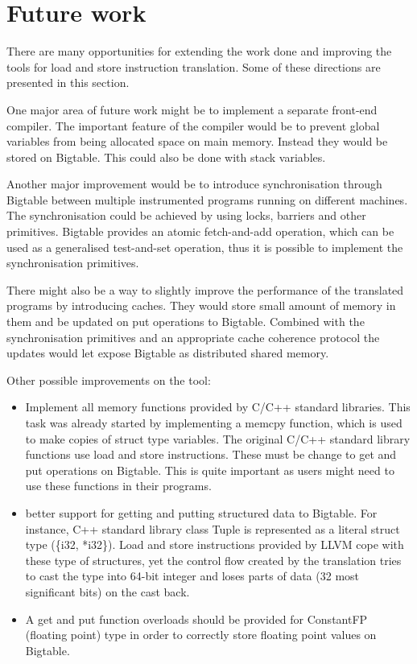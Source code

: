 \documentclass[bsc,frontabs,twoside,singlespacing,parskip,deptreport]{infthesis}     %
\begin{document}
\section{Future work}

There are many opportunities for extending the work done and improving the tools for load and store instruction translation. Some of these directions are presented in this section.

One major area of future work might be to implement a separate front-end compiler. The important feature of the compiler would be to prevent global variables from being allocated space on main memory. Instead they would be stored on Bigtable. This could also be done with stack variables.

Another major improvement would be to introduce synchronisation through Bigtable between multiple instrumented programs running on different machines. The synchronisation could be achieved by using locks, barriers and other primitives. Bigtable provides an atomic fetch-and-add operation, which can be used as a generalised test-and-set operation, thus it is possible to implement the synchronisation primitives.

There might also be a way to slightly improve the performance of the translated programs by introducing caches. They would store small amount of memory in them and be updated on put operations to Bigtable. Combined with the synchronisation primitives and an appropriate cache coherence protocol the updates would let expose Bigtable as distributed shared memory.

Other possible improvements on the tool:
\begin{itemize}
\item
Implement all memory functions provided by C/C++ standard libraries. This task was already started by implementing a memcpy function, which is used to make copies of struct type variables. The original C/C++ standard library functions use load and store instructions. These must be change to get and put operations on Bigtable. This is quite important as users might need to use these functions in their programs.
\item
better support for getting and putting structured data to Bigtable. For instance, C++ standard library class Tuple is represented as a literal struct type (\{i32, *i32\}). Load and store instructions provided by LLVM cope with these type of structures, yet the control flow created by the translation tries to cast the type into 64-bit integer and loses parts of data (32 most significant bits) on the cast back. 
\item
A get and put function overloads should be provided for ConstantFP (floating point) type in order to correctly store floating point values on Bigtable.
\end{itemize}
\end{document}
